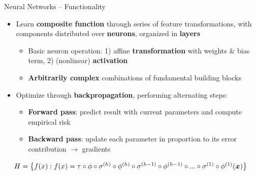 \setdraft

\begin{frame}{Neural Networks -- Functionality}

 
 

\medskip

\begin{itemize}
  \item Learn \textbf{composite function} through series of feature 
  transformations, with components distributed over \textbf{neurons}, organized 
  in \textbf{layers}
  \begin{itemize}
    \item Basic neuron operation: 1) affine \textbf{transformation} with 
    weights \& bias term, 
    2) (nonlinear) \textbf{activation}
    \item \textbf{Arbitrarily complex} combinations of fundamental building 
    blocks
  \end{itemize}
  \item Optimize through \textbf{backpropagation}, performing alternating steps:
  \begin{itemize}
    \item \textbf{Forward pass}: predict result with current parameters and 
    compute empirical risk 
    \item \textbf{Backward pass}: update each parameter in proportion to its 
    error contribution $\rightarrow$ gradients
  \end{itemize}
\end{itemize}

\medskip
 
 ~~
$H = \left\{ f(x): f(x) = \tau \circ \phi \circ \sigma^{(h)} \circ
\phi^{(h)} \circ \sigma^{(h - 1)} \circ \phi^{(h - 1)} \circ ... \circ 
\sigma^{(1)} \circ \phi^{(1)} (\bm{x}) \right\}$

\smallskip


\end{frame}
